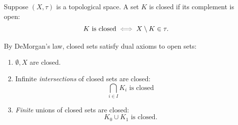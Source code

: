\documentclass[a5paper]{scrbook}
\let\oldiff\iff
\def\iff{\color{gray}\oldiff\color{black}}
\begin{document}
  \begin{defn}[Closed]
    Suppose \((X,\tau)\) is a topological space. A set \(K\) is closed if its complement is open:
    \[
      K\text{ is closed} \iff X\setminus K \in \tau. 
    \]
  \end{defn}
  By DeMorgan's law, closed sets satisfy dual axioms to open sets:
  \begin{enumerate}
    \item \(\emptyset,X\) are closed.
    \item Infinite \emph{intersections} of closed sets are closed:
          \[
          \bigcap_{i\in I} K_i \text{ is closed }
          \]
    \item \emph{Finite} unions of closed sets are closed:
          \[
          K_0 \cup K_1 \text{ is closed. }
          \]
  \end{enumerate}
\end{document}
